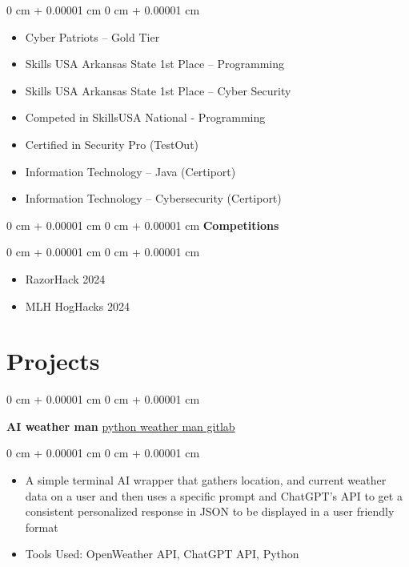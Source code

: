 \documentclass[10pt, letterpaper]{article}
\newenvironment{highlights}{
    \begin{itemize}[
        topsep=0.10 cm,
        parsep=0.10 cm,
        partopsep=0pt,
        itemsep=0pt,
        leftmargin=0 cm + 10pt
    ]
}{
    \end{itemize}
} %
\newenvironment{onecolentry}{
    \begin{adjustwidth}{
        0 cm + 0.00001 cm
    }{
        0 cm + 0.00001 cm
    }
}{
    \end{adjustwidth}
} %
\newenvironment{twocolentry}[2][]{
    \onecolentry
    \def\secondColumn{#2}
    \setcolumnwidth{\fill, 4.5 cm}
    \begin{paracol}{2}
}{
    \switchcolumn \raggedleft \secondColumn
    \end{paracol}
    \endonecolentry
} %
\begin{document}
        \vspace{0.10 cm}
        \begin{onecolentry}
            \begin{highlights}
                \item Cyber Patriots – Gold Tier
                \item Skills USA Arkansas State 1st Place – Programming
                \item Skills USA Arkansas State 1st Place – Cyber Security
                \item Competed in SkillsUSA National - Programming 
                \item Certified in Security Pro (TestOut)
                \item Information Technology – Java (Certiport)
                \item Information Technology – Cybersecurity (Certiport)
            \end{highlights}
        \end{onecolentry}
        \vspace{0.10 cm}
       \begin{onecolentry}{
        }
            \textbf{Competitions}\end{onecolentry}
            
        \vspace{0.10 cm}
        \begin{onecolentry}
            \begin{highlights}
                \item RazorHack 2024 
                \item MLH HogHacks 2024
            \end{highlights}
        \end{onecolentry}


    \section{Projects}

        \begin{twocolentry}{
            \href{https://gitlab.com/paradigms1/pythonaiwetherman}{python weather man gitlab}
        }
            \textbf{AI weather man}\end{twocolentry}

        \vspace{0.10 cm}
        \begin{onecolentry}
            \begin{highlights}
                \item A simple terminal AI wrapper that gathers location, and current weather data on a user and then uses a specific prompt and ChatGPT's API to get a consistent personalized response in JSON to be displayed in a user friendly format 
                \item Tools Used: OpenWeather API, ChatGPT API, Python 
            \end{highlights}
        \end{onecolentry}
\end{document}
